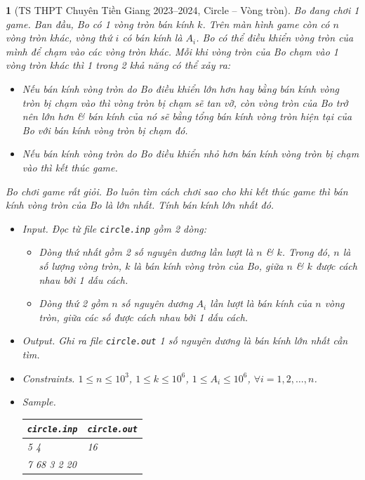 \documentclass{article}
\newtheorem{baitoan}{}
\begin{document}
\begin{baitoan}[TS THPT Chuyên Tiền Giang 2023--2024, Circle -- Vòng tròn]
	Bo đang chơi 1 game. Ban đầu, Bo có 1 vòng tròn bán kính $k$. Trên màn hình game còn có $n$ vòng tròn khác, vòng thứ $i$ có bán kính là $A_i$. Bo có thể điều khiển vòng tròn của mình để chạm vào các vòng tròn khác. Mỗi khi vòng tròn của Bo chạm vào 1 vòng tròn khác thì 1 trong 2 khả năng có thể xảy ra:
	\begin{itemize}
		\item Nếu bán kính vòng tròn do Bo điều khiển lớn hơn hay bằng bán kính vòng tròn bị chạm vào thì vòng tròn bị chạm sẽ tan vỡ, còn vòng tròn của Bo trở nên lớn hơn \& bán kính của nó sẽ bằng tổng bán kính vòng tròn hiện tại của Bo với bán kính vòng tròn bị chạm đó.
		\item Nếu bán kính vòng tròn do Bo điều khiển nhỏ hơn bán kính vòng tròn bị chạm vào thì kết thúc game.
	\end{itemize}
	Bo chơi game rất giỏi. Bo luôn tìm cách chơi sao cho khi kết thúc game thì bán kính vòng tròn của Bo là lớn nhất. Tính bán kính lớn nhất đó.
	\begin{itemize}
		\item {\sf Input.} Đọc từ file \verb|circle.inp| gồm 2 dòng:
		\begin{itemize}
			\item Dòng thứ nhất gồm 2 số nguyên dương lần lượt là $n$ \& $k$. Trong đó, $n$ là số lượng vòng tròn, $k$ là bán kính vòng tròn của Bo, giữa $n$ \& $k$ được cách nhau bởi 1 dấu cách.
			\item Dòng thứ 2 gồm $n$ số nguyên dương $A_i$ lần lượt là bán kính của $n$ vòng tròn, giữa các số được cách nhau bởi 1 dấu cách.
		\end{itemize}
		\item {\sf Output.} Ghi ra file \verb|circle.out| 1 số nguyên dương là bán kính lớn nhất cần tìm.
		\item {\sf Constraints.} $1\le n\le10^3$, $1\le k\le10^6$, $1\le A_i\le10^6$, $\forall i = 1,2,\ldots,n$.
		\item {\sf Sample.}
		\begin{table}[H]
			\centering
			\begin{tabular}{|l|l|}
				\hline
				{\tt circle.inp} & {\tt circle.out} \\
				\hline
				5 4 & 16 \\
				\hline
				7 68 3 2 20 & \\
				\hline
			\end{tabular}
		\end{table}

\end{itemize}
\end{baitoan}
\end{document}
